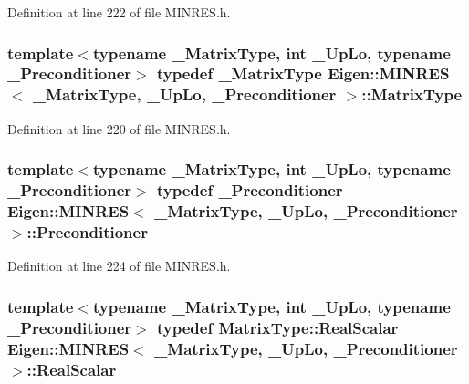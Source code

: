 Definition at line 222 of file M\+I\+N\+R\+E\+S.\+h.

\hypertarget{class_eigen_1_1_m_i_n_r_e_s_a8ce71aa3d9a30f0b6e87e5e96555c4c1}{}
\subsubsection[{Matrix\+Type}]{\setlength{\rightskip}{0pt plus 5cm}template$<$typename \+\_\+\+Matrix\+Type, int \+\_\+\+Up\+Lo, typename \+\_\+\+Preconditioner$>$ typedef \+\_\+\+Matrix\+Type {\bf Eigen\+::\+M\+I\+N\+R\+E\+S}$<$ \+\_\+\+Matrix\+Type, \+\_\+\+Up\+Lo, \+\_\+\+Preconditioner $>$\+::{\bf Matrix\+Type}}\label{class_eigen_1_1_m_i_n_r_e_s_a8ce71aa3d9a30f0b6e87e5e96555c4c1}


Definition at line 220 of file M\+I\+N\+R\+E\+S.\+h.

\hypertarget{class_eigen_1_1_m_i_n_r_e_s_a6fb2cbecafdfb22a1394586753a27ed4}{}
\subsubsection[{Preconditioner}]{\setlength{\rightskip}{0pt plus 5cm}template$<$typename \+\_\+\+Matrix\+Type, int \+\_\+\+Up\+Lo, typename \+\_\+\+Preconditioner$>$ typedef \+\_\+\+Preconditioner {\bf Eigen\+::\+M\+I\+N\+R\+E\+S}$<$ \+\_\+\+Matrix\+Type, \+\_\+\+Up\+Lo, \+\_\+\+Preconditioner $>$\+::{\bf Preconditioner}}\label{class_eigen_1_1_m_i_n_r_e_s_a6fb2cbecafdfb22a1394586753a27ed4}


Definition at line 224 of file M\+I\+N\+R\+E\+S.\+h.

\hypertarget{class_eigen_1_1_m_i_n_r_e_s_afaba94a663df1db559845456b5f50d5c}{}
\subsubsection[{Real\+Scalar}]{\setlength{\rightskip}{0pt plus 5cm}template$<$typename \+\_\+\+Matrix\+Type, int \+\_\+\+Up\+Lo, typename \+\_\+\+Preconditioner$>$ typedef Matrix\+Type\+::\+Real\+Scalar {\bf Eigen\+::\+M\+I\+N\+R\+E\+S}$<$ \+\_\+\+Matrix\+Type, \+\_\+\+Up\+Lo, \+\_\+\+Preconditioner $>$\+::{\bf Real\+Scalar}}\label{class_eigen_1_1_m_i_n_r_e_s_afaba94a663df1db559845456b5f50d5c}


